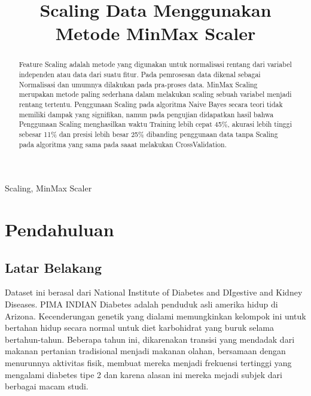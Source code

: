 \documentclass[conference]{IEEEtran}
\begin{document}
\title{Scaling Data Menggunakan Metode MinMax Scaler\\
}

\author{

\and
{}
}

\maketitle

\begin{abstract}
Feature Scaling adalah metode yang digunakan untuk normalisasi rentang dari variabel independen atau data dari suatu fitur. Pada pemrosesan data dikenal sebagai Normalisasi dan umumnya dilakukan pada pra-proses data. MinMax Scaling merupakan metode paling sederhana dalam melakukan scaling sebuah variabel menjadi rentang tertentu. Penggunaan Scaling pada algoritma Naive Bayes secara teori tidak memiliki dampak yang signifikan, namun pada pengujian didapatkan hasil bahwa Penggunaan Scaling menghasilkan waktu Training lebih cepat 45\%, akurasi lebih tinggi sebesar 11\% dan presisi lebih besar 25\% dibanding penggunaan data tanpa Scaling pada algoritma yang sama pada saaat melakukan CrossValidation. 
\end{abstract}

\begin{IEEEkeywords}
Scaling, MinMax Scaler
\end{IEEEkeywords}

\section{Pendahuluan}

\subsection{Latar Belakang}
Dataset ini berasal dari National Institute of Diabetes and DIgestive and Kidney Diseases. PIMA INDIAN Diabetes adalah penduduk asli amerika hidup di Arizona. Kecenderungan genetik yang dialami memungkinkan kelompok ini untuk bertahan hidup secara normal untuk diet karbohidrat yang buruk selama bertahun-tahun. Beberapa tahun ini, dikarenakan transisi yang mendadak dari makanan pertanian tradisional menjadi makanan olahan, bersamaan dengan menurunnya aktivitas fisik, membuat mereka menjadi frekuensi tertinggi yang mengalami diabetes tipe 2 dan karena alasan ini mereka mejadi subjek dari berbagai macam studi. 
\end{document}
